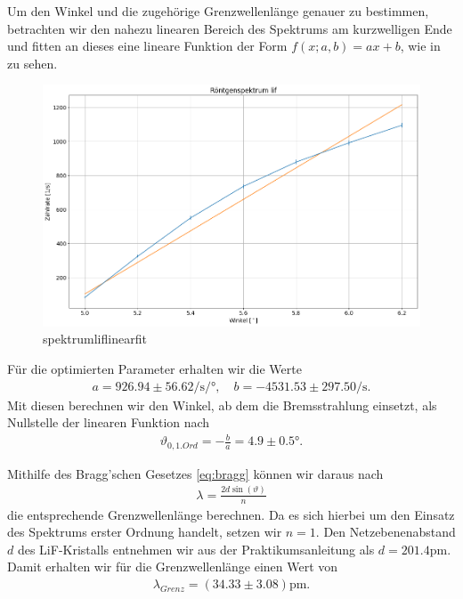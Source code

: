 Um den Winkel und die zugehörige Grenzwellenlänge genauer zu bestimmen, betrachten wir den nahezu linearen Bereich des Spektrums am kurzwelligen Ende und fitten an dieses eine lineare Funktion der Form $f(x;a,b) = ax + b$, wie in  zu sehen.

\begin{figure}[H]
  \centering
  \includegraphics[width=.9\textwidth]{files/plots/spektrum_lif_linear_fit.png}
  \caption{spektrumliflinearfit}
  \label{fig:spektrum_lif_linear_fit}
\end{figure}

Für die optimierten Parameter erhalten wir die Werte
\begin{align}
  a = 926.94 \pm 56.62 \si{\per\second\per\degree},\quad
  b = -4531.53 \pm 297.50 \si{\per\second}.
\end{align}
Mit diesen berechnen wir den Winkel, ab dem die Bremsstrahlung einsetzt, als Nullstelle der linearen Funktion nach
\begin{align}
  \vartheta_{0,1. Ord} = -\frac{b}{a} = 4.9 \pm 0.5 \si{\degree}.
\end{align}

Mithilfe des Bragg'schen Gesetzes \eqref{eq:bragg} können wir daraus nach
\begin{align}
  \lambda = \frac{2d\sin(\vartheta)}{n}
\end{align}
die entsprechende Grenzwellenlänge berechnen. Da es sich hierbei um den Einsatz des Spektrums erster Ordnung handelt, setzen wir $n = 1$. Den Netzebenenabstand $d$ des LiF-Kristalls entnehmen wir aus der Praktikumsanleitung als $d = 201.4\si{\pico\meter}$. Damit erhalten wir für die Grenzwellenlänge einen Wert von
\begin{align}
  \lambda_{Grenz} = (34.33 \pm 3.08) \si{\pico\meter}.
\end{align}

